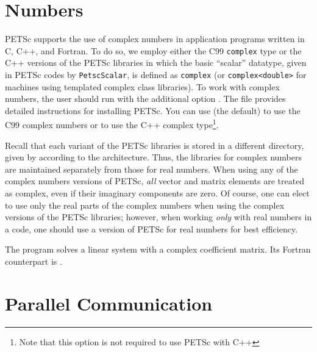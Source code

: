 {{{\section{Numbers}  \label{sec_complex}

PETSc supports the use of complex numbers in application programs
written in C, C++, and Fortran.  To do so, we employ either the C99 \lstinline{complex} type or the C++ versions of
the PETSc libraries in which the basic ``scalar'' datatype, given in
PETSc codes by \lstinline{PetscScalar}, is defined as \lstinline{complex} (or \lstinline{complex<double>}
 for machines using templated complex class
libraries).  To work with complex numbers,
the user should run  with the additional option .
The file \href{https://www.mcs.anl.gov/petsc/documentation/installation.html}{}
provides detailed instructions for installing PETSc.
You can use  (the default) to use the C99 complex numbers or  
to use the C++ complex type\footnote{Note that this option is not required to use PETSc with C++}.

Recall that each variant of the PETSc libraries is stored in a
different directory, given by
according to the architecture. Thus, the
libraries for complex
numbers are maintained separately from those for real
numbers.  When using any of the complex numbers versions of PETSc,
{\em all} vector and matrix elements are treated as complex,
even if their imaginary components are zero.
Of course, one can elect to use only the real parts of the complex
numbers when using the complex versions of the PETSc libraries;
however, when working {\em only} with real numbers in a code,
one should use a version of PETSc for real numbers for best efficiency.

The program \href{http://www.mcs.anl.gov/petsc/petsc-current/src/ksp/ksp/examples/tutorials/ex11.c.html}{}
solves a linear system with a complex
coefficient matrix.  Its Fortran counterpart is
\href{http://www.mcs.anl.gov/petsc/petsc-current/src/ksp/ksp/examples/tutorials/ex11f.F.html}{}.

\section{Parallel Communication}

}}}
